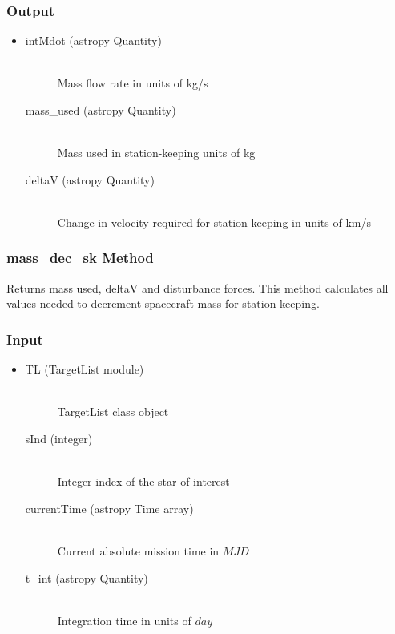 \documentclass[cleanfoot]{asme2ej}
\begin{document}
\subsubsection*{Output}
\begin{itemize}
\item
\begin{description}
    \item[intMdot (astropy Quantity)] \hfill \\ Mass flow rate in units of kg/s
    \item[mass\_used (astropy Quantity)] \hfill \\ Mass used in station-keeping units of kg
    \item[deltaV (astropy Quantity)] \hfill \\ Change in velocity required for station-keeping in units of km/s
\end{description}
\end{itemize}

\subsubsection{mass\_dec\_sk Method} \label{}
Returns mass used, deltaV and disturbance forces. This method calculates all values needed to decrement spacecraft mass for station-keeping.
\subsubsection*{Input}
\begin{itemize}
\item
\begin{description}
    \item[TL (TargetList module)] \hfill \\ TargetList class object
    \item[sInd (integer)] \hfill \\ Integer index of the star of interest
    \item[currentTime (astropy Time array)] \hfill \\ Current absolute mission time in $MJD$
    \item[t\_int (astropy Quantity)] \hfill \\ Integration time in units of $day$
\end{description}
\end{itemize}
\end{document}
